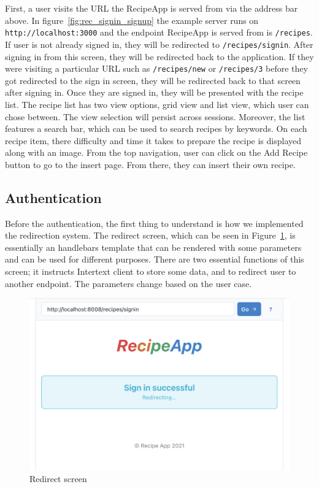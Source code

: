 First, a user visits the URL the RecipeApp is served from via the address bar above. In figure~\ref{fig:rec_signin_signup} the example server runs on \texttt{http://localhost:3000} and the endpoint RecipeApp is served from is \texttt{/recipes}. If user is not already signed in, they will be redirected to \texttt{/recipes/signin}. After signing in from this screen, they will be redirected back to the application. If they were visiting a particular URL such as \texttt{/recipes/new} or \texttt{/recipes/3} before they got redirected to the sign in screen, they will be redirected back to that screen after signing in. Once they are signed in, they will be presented with the recipe list. The recipe list has two view options, grid view and list view, which user can chose between. The view selection will persist across sessions. Moreover, the list features a search bar, which can be used to search recipes by keywords. On each recipe item, there difficulty and time it takes to prepare the recipe is displayed along with an image. From the top navigation, user can click on the Add Recipe button to go to the insert page. From there, they can insert their own recipe.

\subsection{Authentication}

Before the authentication, the first thing to understand is how we implemented the redirection system. The redirect screen, which can be seen in Figure~\ref{fig:rec_redirect}, is essentially an handlebars template that can be rendered with some parameters and can be used for different purposes. There are two essential functions of this screen; it instructs Intertext client to store some data, and to redirect user to another endpoint. The parameters change based on the user case.

\begin{figure}[htb]
  \centering
  \includegraphics[width=12.4cm]{thesis/paper/images/rec_redirect.png}
  \caption{Redirect screen}%
  \label{fig:rec_redirect}%
\end{figure}

